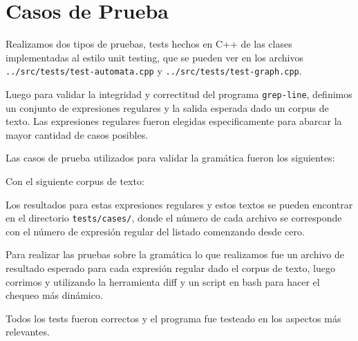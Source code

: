\section{Casos de Prueba}

Realizamos dos tipos de pruebas, tests hechos en C++ de las clases implementadas
al estilo unit testing, que se pueden ver en los archivos 
\texttt{../src/tests/test-automata.cpp} y \texttt{../src/tests/test-graph.cpp}.

Luego para validar la integridad y correctitud del programa \texttt{grep-line},
definimos un conjunto de expresiones regulares y la salida esperada dado un corpus
de texto. Las expresiones regulares fueron elegidas especificamente para abarcar
la mayor cantidad de casos posibles.

Las casos de prueba utilizados para validar la gramática fueron los siguientes:



Con el siguiente corpus de texto:


Los resultados para estas expresiones regulares y estos textos se pueden encontrar 
en el directorio \texttt{tests/cases/}, donde el número de cada archivo se corresponde 
con el número de expresión regular del listado comenzando desde cero.

Para realizar las pruebas sobre la gramática lo que realizamos fue un archivo
de resultado esperado para cada expresión regular dado el corpus de texto, 
luego corrimos y utilizando la herramienta diff y un script en bash para hacer 
el chequeo más dinámico.

Todos los tests fueron correctos y el programa fue testeado en los aspectos más relevantes.

\bigskip
